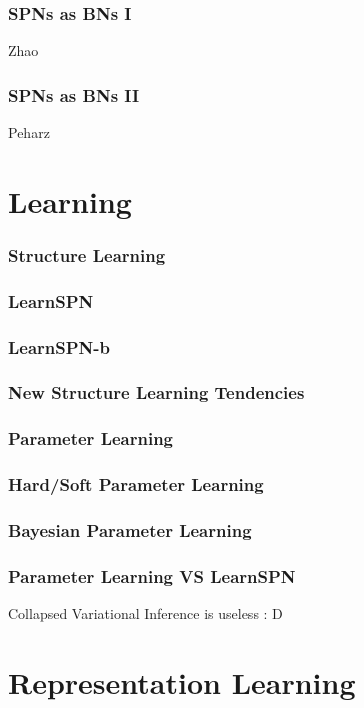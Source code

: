 \documentclass[10pt,t]{beamer}
\begin{document}
\begin{frame}
  \frametitle{SPNs as BNs I}
  Zhao
\end{frame}

\begin{frame}
  \frametitle{SPNs as BNs II}
  Peharz
\end{frame}


\section{Learning}
{
  \begin{frame}
    \sectionpage
  \end{frame}
}

\begin{frame}
  \frametitle{Structure Learning}
\end{frame}

\begin{frame}
  \frametitle{LearnSPN}
\end{frame}

\begin{frame}
  \frametitle{LearnSPN-b}
\end{frame}

\begin{frame}
  \frametitle{New Structure Learning Tendencies}
\end{frame}

\begin{frame}
\frametitle{Parameter Learning}
\end{frame}

\begin{frame}
  \frametitle{Hard/Soft Parameter Learning}
\end{frame}

\begin{frame}
  \frametitle{Bayesian Parameter Learning}
\end{frame}

\begin{frame}
  \frametitle{Parameter Learning VS LearnSPN}
  Collapsed Variational Inference is useless : D
\end{frame}

\section{Representation Learning}
{
  \begin{frame}
    \sectionpage
  \end{frame}
}
\end{document}
